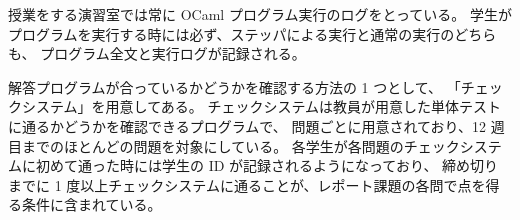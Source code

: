 授業をする演習室では常に OCaml プログラム実行のログをとっている。
学生がプログラムを実行する時には必ず、ステッパによる実行と通常の実行のどちらも、
プログラム全文と実行ログが記録される。

解答プログラムが合っているかどうかを確認する方法の 1 つとして、
「チェックシステム」を用意してある。
チェックシステムは教員が用意した単体テストに通るかどうかを確認できるプログラムで、
問題ごとに用意されており、12 週目までのほとんどの問題を対象にしている。
各学生が各問題のチェックシステムに初めて通った時には学生の ID が記録されるようになっており、
締め切りまでに 1 度以上チェックシステムに通ることが、レポート課題の各問で点を得る条件に含まれている。
